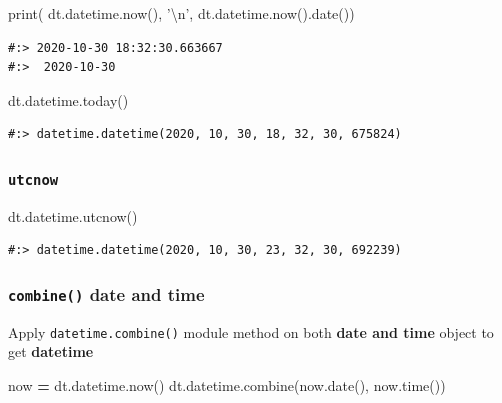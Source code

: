 \documentclass[
]{book}
\newenvironment{Shaded}{\begin{snugshade}}{\end{snugshade}}
\newcommand{\BuiltInTok}[1]{#1}
\newcommand{\CharTok}[1]{\textcolor[rgb]{0.5,0.5,0.5}{#1}}
\newcommand{\NormalTok}[1]{#1}
\newcommand{\OperatorTok}[1]{\textcolor[rgb]{0.43,0.43,0.43}{\textbf{#1}}}
\newcommand{\StringTok}[1]{\textcolor[rgb]{0.5,0.5,0.5}{#1}}
\begin{document}
\begin{Shaded}
\begin{Highlighting}[]
\BuiltInTok{print}\NormalTok{(  dt.datetime.now(), }\StringTok{'}\CharTok{\textbackslash{}n}\StringTok{'}\NormalTok{,}
\NormalTok{        dt.datetime.now().date())}
\end{Highlighting}
\end{Shaded}

\begin{verbatim}
#:> 2020-10-30 18:32:30.663667 
#:>  2020-10-30
\end{verbatim}

\begin{Shaded}
\begin{Highlighting}[]
\NormalTok{dt.datetime.today()}
\end{Highlighting}
\end{Shaded}

\begin{verbatim}
#:> datetime.datetime(2020, 10, 30, 18, 32, 30, 675824)
\end{verbatim}

\hypertarget{utcnow}{%
\subsubsection{\texorpdfstring{\texttt{utcnow}}{utcnow}}\label{utcnow}}

\begin{Shaded}
\begin{Highlighting}[]
\NormalTok{dt.datetime.utcnow()}
\end{Highlighting}
\end{Shaded}

\begin{verbatim}
#:> datetime.datetime(2020, 10, 30, 23, 32, 30, 692239)
\end{verbatim}

\hypertarget{combine-date-and-time}{%
\subsubsection{\texorpdfstring{\texttt{combine()} date and time}{combine() date and time}}\label{combine-date-and-time}}

Apply \texttt{datetime.combine()} module method on both \textbf{date and time} object to get \textbf{datetime}

\begin{Shaded}
\begin{Highlighting}[]
\NormalTok{now }\OperatorTok{=}\NormalTok{ dt.datetime.now()}
\NormalTok{dt.datetime.combine(now.date(), now.time())}
\end{Highlighting}
\end{Shaded}
\end{document}
